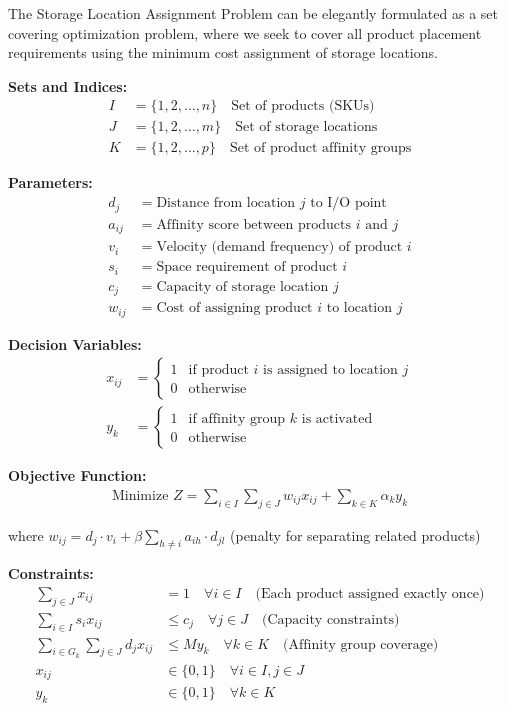 \documentclass{article}
\begin{document}
The Storage Location Assignment Problem can be elegantly formulated as a set covering optimization problem, where we seek to cover all product placement requirements using the minimum cost assignment of storage locations.

\textbf{Sets and Indices:}
\begin{align}
I &= \{1, 2, \ldots, n\} \quad \text{Set of products (SKUs)}\\
J &= \{1, 2, \ldots, m\} \quad \text{Set of storage locations}\\
K &= \{1, 2, \ldots, p\} \quad \text{Set of product affinity groups}
\end{align}

\textbf{Parameters:}
\begin{align}
d_j &= \text{Distance from location } j \text{ to I/O point}\\
a_{ij} &= \text{Affinity score between products } i \text{ and } j\\
v_i &= \text{Velocity (demand frequency) of product } i\\
s_i &= \text{Space requirement of product } i\\
c_j &= \text{Capacity of storage location } j\\
w_{ij} &= \text{Cost of assigning product } i \text{ to location } j
\end{align}

\textbf{Decision Variables:}
\begin{align}
x_{ij} &= \begin{cases} 
1 & \text{if product } i \text{ is assigned to location } j \\
0 & \text{otherwise}
\end{cases}\\
y_k &= \begin{cases}
1 & \text{if affinity group } k \text{ is activated} \\
0 & \text{otherwise}
\end{cases}
\end{align}

\textbf{Objective Function:}
\begin{align}
\text{Minimize } Z = \sum_{i \in I} \sum_{j \in J} w_{ij} x_{ij} + \sum_{k \in K} \alpha_k y_k
\end{align}

where $w_{ij} = d_j \cdot v_i + \beta \sum_{h \neq i} a_{ih} \cdot d_{jl}$ (penalty for separating related products)

\textbf{Constraints:}
\begin{align}
\sum_{j \in J} x_{ij} &= 1 \quad \forall i \in I \quad \text{(Each product assigned exactly once)}\\
\sum_{i \in I} s_i x_{ij} &\leq c_j \quad \forall j \in J \quad \text{(Capacity constraints)}\\
\sum_{i \in G_k} \sum_{j \in J} d_j x_{ij} &\leq M y_k \quad \forall k \in K \quad \text{(Affinity group coverage)}\\
x_{ij} &\in \{0,1\} \quad \forall i \in I, j \in J\\
y_k &\in \{0,1\} \quad \forall k \in K
\end{align}
\end{document}
